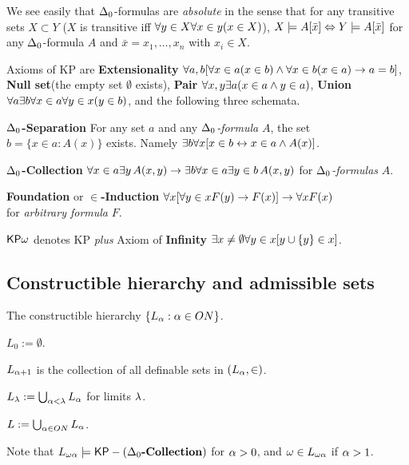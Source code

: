\documentclass{article}
\begin{document}
We see easily that $\Delta_{0}$-formulas are \textit{absolute} in the sense that
for any transitive sets $X\subset Y$ ($X$ is transitive iff $\forall y\in X\forall x\in y(x\in X)$), 
$X\models A[\bar{x}] \Leftrightarrow Y\models A[\bar{x}]$ for any $\Delta_{0}$-formula $A$ and $\bar{x}=x_{1},\ldots,x_{n}$ with $x_{i}\in X$.

\bdf
{\rm
Axioms of {\sf KP} are {\bf Extensionality} $\forall a,b[\forall x\in a(x\in b)\land\forall x\in b(x\in a)\to a=b]$, 
{\bf Null set}(the empty set $\emptyset$ exists), {\bf Pair} $\forall x,y\exists a(x\in a\land y\in a)$, 
{\bf Union} $\forall a\exists b\forall x\in a\forall y\in x(y\in b)$, and the following three schemata.
\bdes
\item[{\bf $\Delta_{0}$-Separation}]
For any set $a$ and any \textit{$\Delta_{0}$-formula} $A$, the set $b=\{x\in a: A(x)\}$ exists.
Namely $\exists b\forall x[x\in b \leftrightarrow x\in a\land A(x)]$.

\item[{\bf $\Delta_{0}$-Collection}]
$\forall x\in a\exists y \, A(x,y) \rightarrow \exists b\forall x\in a\exists y\in b\, A(x,y)$ for \textit{$\Delta_{0}$-formulas} $A$.

\item[{\bf Foundation} or {\bf $\in$-Induction}]
$\forall x[\forall y\in x F(y) \rightarrow F(x)] \rightarrow \forall x F(x)$
\\
 for \textit{arbitrary formula} $F$.
\edes
}
\edf



${\sf KP}\omega$ denotes {\sf KP} 
\textit{plus} Axiom of 
{\bf Infinity} 
$\exists x\neq\emptyset\forall y\in x[y\cup\{y\}\in x]$.


\subsection{Constructible hierarchy and admissible sets}

The constructible hierarchy
$\{L_{\alpha}: \alpha\in ON\}$.
\benu
\item 
$L_{0}:=\emptyset$.
\item 
$L_{\alpha+1}$ is the collection of all definable sets in $(L_{\alpha},\in)$.

\item
$L_{\lambda}:=\bigcup_{\alpha<\lambda}L_{\alpha}$ for limits $\lambda$.
\item
$L:=\bigcup_{\alpha\in ON}L_{\alpha}$.
\eenu

Note that
$L_{\omega\alpha}\models {\sf KP}- \left( \Delta_{0}\mbox{{\bf -Collection}}\right)$ for $\alpha>0$,
and $\omega\in L_{\omega\alpha}$ if $\alpha>1$.
\end{document}
